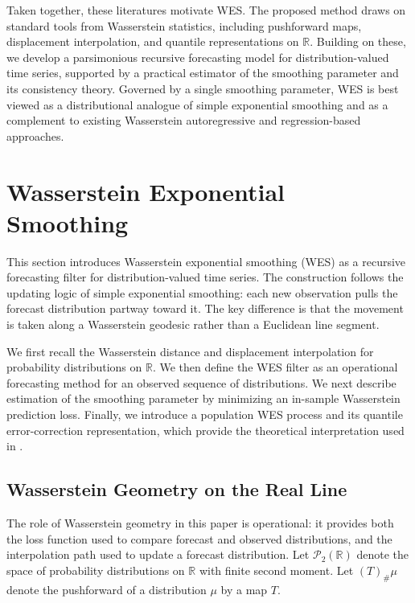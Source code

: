 \documentclass[a4paper, 11pt]{article}
\newcommand{\R}{\mathbb{R}}
\theoremstyle{definition}
\begin{document}
Taken together, these literatures motivate WES.
The proposed method draws on standard tools from Wasserstein statistics, including pushforward maps, displacement interpolation, and quantile representations on $\R$.
Building on these, we develop a parsimonious recursive forecasting model for distribution-valued time series, supported by a practical estimator of the smoothing parameter and its consistency theory.
Governed by a single smoothing parameter, WES is best viewed as a distributional analogue of simple exponential smoothing and as a complement to existing Wasserstein autoregressive and regression-based approaches.



\section{Wasserstein Exponential Smoothing} \label{sec:methodology}

This section introduces Wasserstein exponential smoothing (WES) as a recursive forecasting filter for distribution-valued time series. 
The construction follows the updating logic of simple exponential smoothing: each new observation pulls the forecast distribution partway toward it. 
The key difference is that the movement is taken along a Wasserstein geodesic rather than a Euclidean line segment.

We first recall the Wasserstein distance and displacement interpolation for probability distributions on $\R$.
We then define the WES filter as an operational forecasting method for an observed sequence of distributions. 
We next describe estimation of the smoothing parameter by minimizing an in-sample Wasserstein prediction loss. 
Finally, we introduce a population WES process and its quantile error-correction representation, which provide the theoretical interpretation used in .


\subsection{Wasserstein Geometry on the Real Line}

The role of Wasserstein geometry in this paper is operational: it provides both the loss function used to compare forecast and observed distributions, and the interpolation path used to update a forecast distribution. 
Let $\mathcal P_2(\R)$ denote the space of probability distributions on $\R$ with finite second moment. 
Let $( T )_\# \mu$ denote the pushforward of a distribution $\mu$ by a map $T$.
\end{document}
